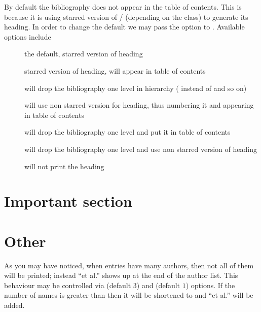 By default the bibliography does not appear in the table of contents. This is
because it is using starred version of \slash{}
(depending on the class) to generate its heading. In order to change the default we
may pass the option  to . Available
options include
\begin{description}
  \item[] the default, starred version of heading
  \item[] starred version of heading, will appear in table of contents
  \item[] will drop the bibliography one level in
    hierarchy ( instead of  and so on)
  \item[] will use non starred version for heading, thus
    numbering it and appearing in table of contents
  \item[] will drop the bibliography one level and put it in
    table of contents
  \item[] will drop the bibliography one level and use
    non starred version of heading
  \item[] will not print the heading
\end{description}

\begin{example}[standalone,
  biber,
  biber_dir=../src/examples/,
  paperwidth=7.6cm,
  paperheight=7.5cm,
]
\usepackage{biblatex}


\setlength{\parindent}{0pt}
\nocite{curie}
\tableofcontents
\section{Important section}


\section{Other}

\printbibliography[
  heading=subbibnumbered,
  title=Bibliography
]



\end{example}

As you may have noticed, when entries have many authors, then not all of
them will be printed; instead ``et al.'' shows up at the end of the author list. This behaviour
may be controlled via  (default $3$) and 
(default $1$) options. If the number of names is greater than 
then it will be shortened to  and ``et al.'' will be added.

